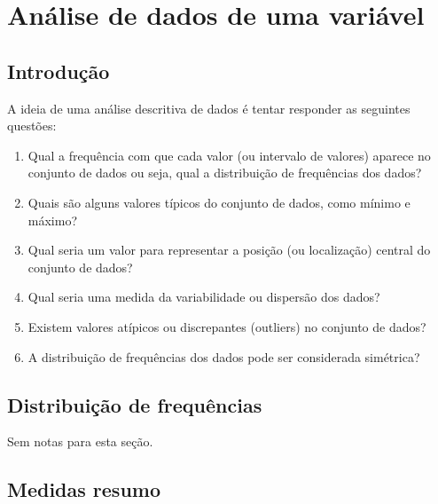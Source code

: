 \documentclass[
]{latex/krantz}
\providecommand{\tightlist}{%
  \setlength{\itemsep}{0pt}\setlength{\parskip}{0pt}}
\renewenvironment{quote}{\begin{VF}}{\end{VF}}
\theoremstyle{definition}
\theoremstyle{definition}
\theoremstyle{definition}
\theoremstyle{definition}
\theoremstyle{remark}
\begin{document}
\hypertarget{anuxe1lise-de-dados-de-uma-variuxe1vel}{%
\chapter{Análise de dados de uma variável}\label{anuxe1lise-de-dados-de-uma-variuxe1vel}}

\hypertarget{introduuxe7uxe3o-1}{%
\section{Introdução}\label{introduuxe7uxe3o-1}}

\begin{quote}
A ideia de uma análise descritiva de dados é tentar responder as seguintes questões:

\begin{enumerate}
\def\labelenumi{\roman{enumi})}
\tightlist
\item
  Qual a frequência com que cada valor (ou intervalo de valores) aparece no conjunto de dados ou seja, qual a distribuição de frequências dos dados?
\item
  Quais são alguns valores típicos do conjunto de dados, como mínimo e máximo?
\item
  Qual seria um valor para representar a posição (ou localização) central do conjunto de dados?
\item
  Qual seria uma medida da variabilidade ou dispersão dos dados?
\item
  Existem valores atípicos ou discrepantes (outliers) no conjunto de dados?
\item
  A distribuição de frequências dos dados pode ser considerada simétrica?
\end{enumerate}

\citep[p.~37]{MorettinSinger2022}
\end{quote}

\hypertarget{distribuiuxe7uxe3o-de-frequuxeancias}{%
\section{Distribuição de frequências}\label{distribuiuxe7uxe3o-de-frequuxeancias}}

Sem notas para esta seção.

\hypertarget{medidas-resumo}{%
\section{Medidas resumo}\label{medidas-resumo}}
\end{document}
